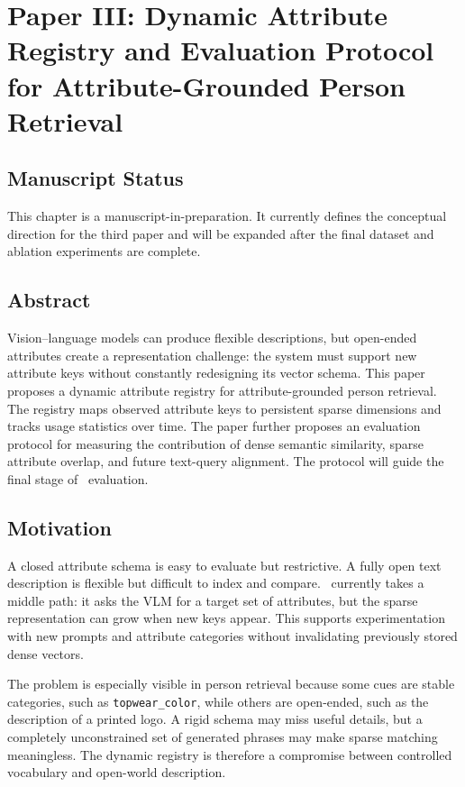 \chapter[Paper III: Dynamic Attribute Registry and Evaluation Protocol]{Paper III: Dynamic Attribute Registry and Evaluation Protocol for Attribute-Grounded Person Retrieval}
\label{paper:attribute-registry-protocol}

\section*{Manuscript Status}

This chapter is a manuscript-in-preparation. It currently defines the conceptual direction for the third paper and will be expanded after the final dataset and ablation experiments are complete.

\section{Abstract}

Vision--language models can produce flexible descriptions, but open-ended attributes create a representation challenge: the system must support new attribute keys without constantly redesigning its vector schema. This paper proposes a dynamic attribute registry for attribute-grounded person retrieval. The registry maps observed attribute keys to persistent sparse dimensions and tracks usage statistics over time. The paper further proposes an evaluation protocol for measuring the contribution of dense semantic similarity, sparse attribute overlap, and future text-query alignment. The protocol will guide the final stage of \systemname\ evaluation.

\section{Motivation}

A closed attribute schema is easy to evaluate but restrictive. A fully open text description is flexible but difficult to index and compare. \systemname\ currently takes a middle path: it asks the VLM for a target set of attributes, but the sparse representation can grow when new keys appear. This supports experimentation with new prompts and attribute categories without invalidating previously stored dense vectors.

The problem is especially visible in person retrieval because some cues are stable categories, such as \texttt{topwear\_color}, while others are open-ended, such as the description of a printed logo. A rigid schema may miss useful details, but a completely unconstrained set of generated phrases may make sparse matching meaningless. The dynamic registry is therefore a compromise between controlled vocabulary and open-world description.

